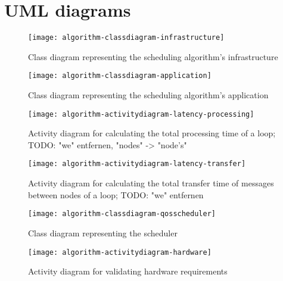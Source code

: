 \clearpage
\appendix

\chapter{UML diagrams\label{cha:algorithm-UML-diagrams}}

\begin{figure}[htb]
    \centering
    \texttt{[image: algorithm-classdiagram-infrastructure]}
    \caption{Class diagram representing the scheduling algorithm's infrastructure}
    \label{fig:classdiagram-infrastructure}
\end{figure}

\begin{figure}[htb]
    \centering
    \texttt{[image: algorithm-classdiagram-application]}
    \caption{Class diagram representing the scheduling algorithm's application}
    \label{fig:classdiagram-application}
\end{figure}

\begin{figure}[htb]
    \centering
    \texttt{[image: algorithm-activitydiagram-latency-processing]}
    \caption{Activity diagram for calculating the total processing time of a loop; TODO: "we" entfernen, "nodes" -> "node's"}
    \label{fig:algorithm-activitydiagram-latency-processing}
\end{figure}

\begin{figure}[htb]
    \centering
    \texttt{[image: algorithm-activitydiagram-latency-transfer]}
    \caption{Activity diagram for calculating the total transfer time of messages between nodes of a loop; TODO: "we" entfernen}
    \label{fig:algorithm-activitydiagram-latency-transfer}
\end{figure}



\begin{figure}[htb]
    \centering
    \texttt{[image: algorithm-classdiagram-qosscheduler]}
    \caption{Class diagram representing the scheduler}
    \label{fig:classdiagram-qosscheduler}
\end{figure}

\begin{figure}[htb]
    \centering
    \texttt{[image: algorithm-activitydiagram-hardware]}
    \caption{Activity diagram for validating hardware requirements}
    \label{fig:algorithm-activitydiagram-hardware}
\end{figure}


